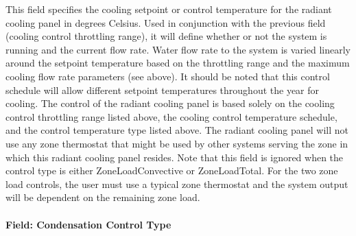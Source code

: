 This field specifies the cooling setpoint or control temperature for the radiant cooling panel in degrees Celsius. Used in conjunction with the previous field (cooling control throttling range), it will define whether or not the system is running and the current flow rate. Water flow rate to the system is varied linearly around the setpoint temperature based on the throttling range and the maximum cooling flow rate parameters (see above). It should be noted that this control schedule will allow different setpoint temperatures throughout the year for cooling. The control of the radiant cooling panel is based solely on the cooling control throttling range listed above, the cooling control temperature schedule, and the control temperature type listed above. The radiant cooling panel will not use any zone thermostat that might be used by other systems serving the zone in which this radiant cooling panel resides.  Note that this field is ignored when the control type is either ZoneLoadConvective or ZoneLoadTotal.  For the two zone load controls, the user must use a typical zone thermostat and the system output will be dependent on the remaining zone load.

\paragraph{Field: Condensation Control Type}\label{field-condensation-control-type}


